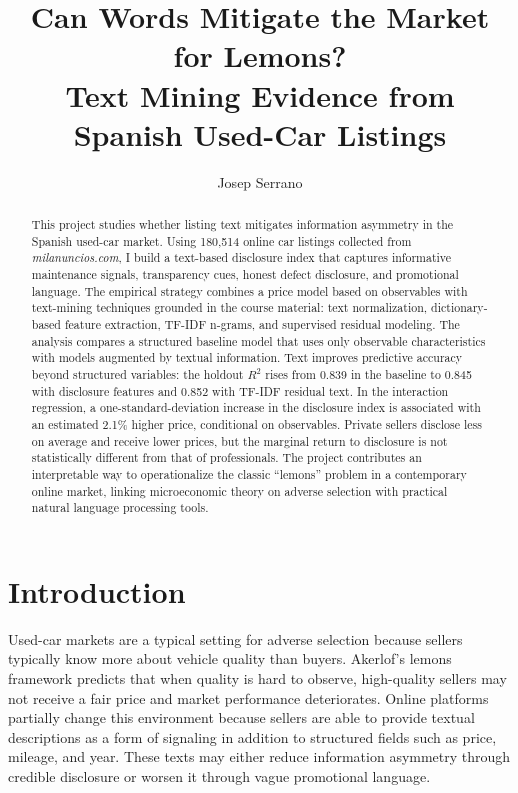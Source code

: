 \documentclass[10pt,twocolumn]{article}
\title{Can Words Mitigate the Market for Lemons?\\Text Mining Evidence from Spanish Used-Car Listings}
\author{Josep Serrano}
\date{}
\begin{document}
\maketitle

\begin{abstract}
This project studies whether listing text mitigates information asymmetry in the Spanish used-car market. Using 180{,}514 online car listings collected from \textit{milanuncios.com}, I build a text-based disclosure index that captures informative maintenance signals, transparency cues, honest defect disclosure, and promotional language. The empirical strategy combines a price model based on observables with text-mining techniques grounded in the course material: text normalization, dictionary-based feature extraction, TF-IDF n-grams, and supervised residual modeling. The analysis compares a structured baseline model that uses only observable characteristics with models augmented by textual information. Text improves predictive accuracy beyond structured variables: the holdout $R^2$ rises from 0.839 in the baseline to 0.845 with disclosure features and 0.852 with TF-IDF residual text. In the interaction regression, a one-standard-deviation increase in the disclosure index is associated with an estimated 2.1\% higher price, conditional on observables. Private sellers disclose less on average and receive lower prices, but the marginal return to disclosure is not statistically different from that of professionals. The project contributes an interpretable way to operationalize the classic ``lemons'' problem in a contemporary online market, linking microeconomic theory on adverse selection with practical natural language processing tools.
\end{abstract}

\section{Introduction}
Used-car markets are a typical setting for adverse selection because sellers typically know more about vehicle quality than buyers. Akerlof's lemons framework predicts that when quality is hard to observe, high-quality sellers may not receive a fair price and market performance deteriorates. Online platforms partially change this environment because sellers are able to provide textual descriptions as a form of signaling in addition to structured fields such as price, mileage, and year. These texts may either reduce information asymmetry through credible disclosure or worsen it through vague promotional language.
\end{document}
